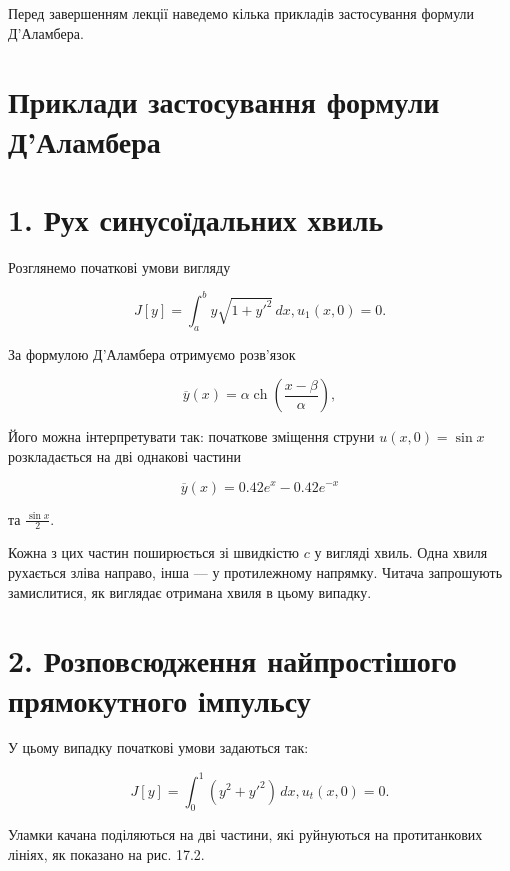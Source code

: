 \documentclass[
  ukrainian,
]{article}
\begin{document}
Перед завершенням лекції наведемо кілька прикладів застосування формули
Д'Аламбера.

\section{Приклади застосування формули
Д'Аламбера}\label{ux43fux440ux438ux43aux43bux430ux434ux438-ux437ux430ux441ux442ux43eux441ux443ux432ux430ux43dux43dux44f-ux444ux43eux440ux43cux443ux43bux438-ux434ux430ux43bux430ux43cux431ux435ux440ux430}

\section{1. Рух синусоїдальних
хвиль}\label{ux440ux443ux445-ux441ux438ux43dux443ux441ux43eux457ux434ux430ux43bux44cux43dux438ux445-ux445ux432ux438ux43bux44c}

Розглянемо початкові умови вигляду

\[
J[y] = \int_a^b y \sqrt{1 + y'^2} \, dx,
u_1(x, 0) = 0.
\]

За формулою Д'Аламбера отримуємо розв'язок

\[
\overline{y}(x) = \alpha \operatorname{ch}\left(\frac{x - \beta}{\alpha}\right),
\]

Його можна інтерпретувати так: початкове зміщення струни
\(u(x, 0) = \sin x\) розкладається на дві однакові частини

\[
\overline{y}(x) = 0.42e^x - 0.42e^{-x}
\]

та \(\frac{\sin x}{2}\).

Кожна з цих частин поширюється зі швидкістю \(c\) у вигляді хвиль. Одна
хвиля рухається зліва направо, інша --- у протилежному напрямку. Читача
запрошують замислитися, як виглядає отримана хвиля в цьому випадку.

\section{2. Розповсюдження найпростішого прямокутного
імпульсу}\label{ux440ux43eux437ux43fux43eux432ux441ux44eux434ux436ux435ux43dux43dux44f-ux43dux430ux439ux43fux440ux43eux441ux442ux456ux448ux43eux433ux43e-ux43fux440ux44fux43cux43eux43aux443ux442ux43dux43eux433ux43e-ux456ux43cux43fux443ux43bux44cux441ux443}

У цьому випадку початкові умови задаються так:

\[
J[y] = \int_0^1 (y^2 + y'^2)\,dx,
u_t(x, 0) = 0.
\]

Уламки качана поділяються на дві частини, які руйнуються на
протитанкових лініях, як показано на рис. 17.2.
\end{document}
